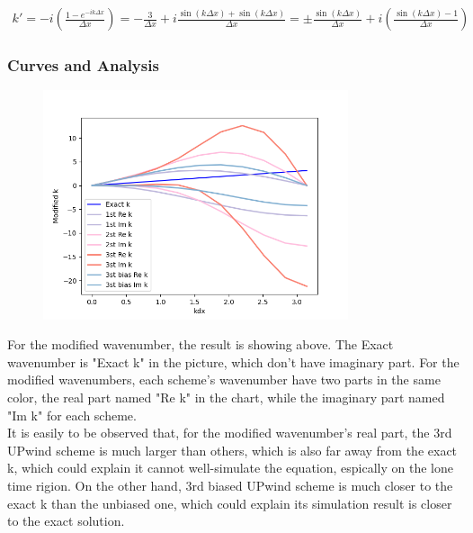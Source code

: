\documentclass[12pt]{article}
\begin{document}
\begin{equation}
    \begin{aligned}
    k' = -i\left(\frac{1 - e^{-ik\Delta x}}{\Delta x}\right) = -\frac{3}{\Delta x} + i\frac{\sin(k\Delta x) + \sin(k\Delta x)}{\Delta x} = \pm \frac{\sin(k\Delta x)}{\Delta x} + i \left(\frac{\sin(k\Delta x) - 1}{\Delta x}\right)
    \end{aligned}
\end{equation}
    
    

\subsubsection{Curves and Analysis}


\begin{figure}[H]
    \centering
    \includegraphics[width=0.8\textwidth]{figures/modifiedwavenumber.png}
    \label{IGs.jpg}
\end{figure}

For the modified wavenumber, the result is showing above. The Exact 
wavenumber is "Exact k" in the picture, which don't have imaginary part. 
For the modified wavenumbers, each scheme's wavenumber have two parts
in the same color, the real part named "Re k" in the chart, while the 
imaginary part named "Im k" for each scheme.\\

It is easily to be observed that, for the modified wavenumber's real part,
the 3rd UPwind scheme is much larger than others, which is also far away 
from the exact k, which could explain it cannot well-simulate the equation,
espically on the lone time rigion. On the other hand, 3rd biased UPwind
scheme is much closer to the exact k than the unbiased one, which could 
explain its simulation result is closer to the exact solution.
\end{document}
